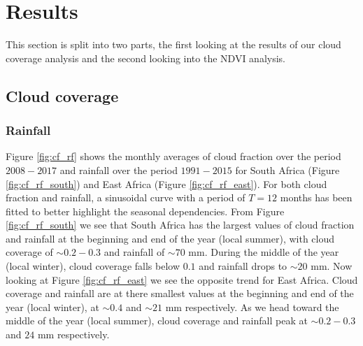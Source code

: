\section{Results}
This section is split into two parts, the first looking at the results
of our cloud coverage analysis and the second looking into the NDVI
analysis.
\subsection{Cloud coverage}
\subsubsection{Rainfall}
Figure \ref{fig:cf_rf} shows the monthly averages of cloud fraction
over the period $2008-2017$ and rainfall over the period $1991-2015$
for South Africa (Figure \ref{fig:cf_rf_south}) and East Africa
(Figure \ref{fig:cf_rf_east}). For both cloud fraction and rainfall, a
sinusoidal curve with a period of $T=12$ months has been fitted to
better highlight the seasonal dependencies. From Figure
\ref{fig:cf_rf_south} we see that South Africa has the largest values
of cloud fraction and rainfall at the beginning and end of the year
(local summer), with cloud coverage of $\sim0.2-0.3$ and rainfall of
$\sim70$ mm. During the middle of the year (local winter), cloud coverage
falls below $0.1$ and rainfall drops to $\sim20$ mm. Now looking at
Figure \ref{fig:cf_rf_east} we see the opposite trend for East
Africa. Cloud coverage and rainfall are at there smallest values at
the beginning and end of the year (local winter), at $\sim0.4$ and $\sim21$
mm respectively. As we head toward the middle of the year (local summer), cloud coverage and rainfall peak at $\sim0.2-0.3$ and $24$ mm respectively.
